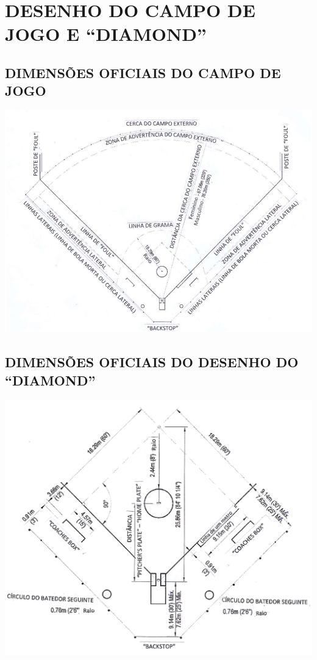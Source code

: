 \chapter{DESENHO DO CAMPO DE JOGO E “DIAMOND”}
\label{ap:Campo}

\section{DIMENSÕES OFICIAIS DO CAMPO DE JOGO} 

{\begin{center}
		\includegraphics[width=.70\textwidth]{fig/campo01}
\end{center}}
\clearpage
\section{DIMENSÕES OFICIAIS DO DESENHO DO “DIAMOND” }

{\begin{center}
		\includegraphics[width=.75\textwidth]{fig/campo02}\end{center}}

